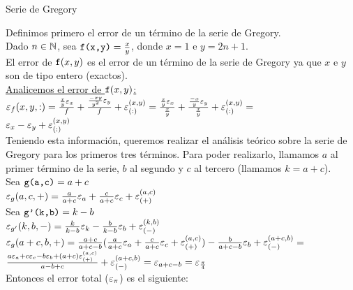 \begin{subsection}{Serie de Gregory}

	\large
	
	Definimos primero el error de un término de la serie de Gregory.\\

	Dado $n \in \mathbb{N}$, sea $\texttt{f(x,y)}=\frac{x}{y}$, donde $x=1$ e $y=2n+1$.\\
	
	El error de $\texttt{f}(x,y)$ es el error de un término de la serie de Gregory ya que $x$ e $y$ son de tipo entero (exactos).\\
	
	\underline{Analicemos el error de $\texttt{f}(x,y)$:}\\
	
	$\texttt{$\varepsilon _{f}({x,y,:})$}=\frac{\frac{x}{y}\varepsilon _{x}}{f} + \frac{\frac{-xy}{y^2}\varepsilon _{y}}{f} + \varepsilon _{({:})}^{({x,y})} = 
	\frac{\frac{x}{y}\varepsilon _{x}}{\frac{x}{y}} + \frac{\frac{-x}{y}\varepsilon _{y}}{\frac{x}{y}} + \varepsilon _{({:})}^{({x,y})} =$\\
	
	$\varepsilon _{x} - \varepsilon _{y} + \varepsilon _{({:})}^{({x,y})}$\\
	
	Teniendo esta información, queremos realizar el análisis teórico sobre la serie de Gregory para los primeros tres términos. Para poder realizarlo, llamamos $a$ al primer término de la serie,
	$b$ al segundo y $c$ al tercero (llamamos $k=a+c$).\\
	
	Sea $\texttt{g(a,c)}=a+c$\\
	
	$\varepsilon _{g}({a,c,+}) = \frac{a}{a+c}\varepsilon _{a} + \frac{c}{a+c}\varepsilon _{c} + \varepsilon _{({+})}^{({a,c})}$\\
	
	Sea $\texttt{g'(k,b)}=k-b$\\
	
	$\varepsilon _{g'}({k,b,-}) = \frac{k}{k-b}\varepsilon _{k} - \frac{b}{k-b}\varepsilon _{b} + \varepsilon _{({-})}^{({k,b})}$\\
	
	$\varepsilon _{g}({a+c,b,+}) = \frac{a+c}{a+c-b}(\frac{a}{a+c}\varepsilon _{a} + \frac{c}{a+c}\varepsilon _{c} + \varepsilon _{({+})}^{({a,c})}) - \frac{b}{a+c-b}\varepsilon _{b} + \varepsilon _{({-})}^{({a+c,b})} =$\\
	
	$\frac{a\varepsilon _{a} + c\varepsilon _{c} - b\varepsilon _{b} + (a+c)\varepsilon _{({+})}^{({a,c})}}{a-b+c} + \varepsilon _{({-})}^{({a+c,b})} = \varepsilon _{a+c-b} = \varepsilon _{\frac{\pi}{4}}$\\
	
	Entonces el error total ($\varepsilon _{\pi}$) es el siguiente:\\
	

\end{subsection}
